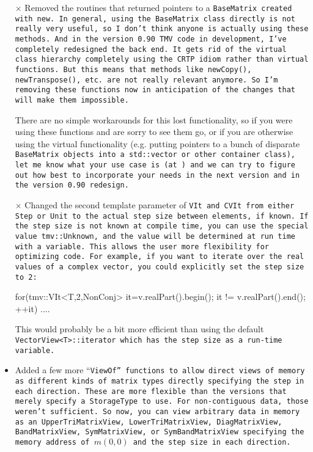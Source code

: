 \begin{itemize}
\item[$\times$] 
Removed the routines that returned pointers to a \tt{BaseMatrix} created with \tt{new}.  In general, using the \tt{BaseMatrix} class directly is not really very useful, so I don't think anyone is actually using these methods.  And in the version 0.90 TMV code in development, I've completely redesigned the back end.  It gets rid of the virtual class hierarchy completely using the CRTP idiom rather than virtual functions.  But this means that methods like \tt{newCopy()}, \tt{newTranspose()}, etc. are not really relevant anymore.  So I'm removing these functions now in anticipation of the changes that will make them impossible.

There are no simple workarounds for this lost functionality, so if you were using these functions and are sorry to see them go, or if you are otherwise using the virtual functionality (e.g. putting pointers to a bunch of disparate \tt{BaseMatrix} objects into a \tt{std::vector} or other container class), let me know what your use case is (at \mygroup) and we can try to figure out how best to incorporate your needs in the next version and in the version 0.90 redesign.

\item[$\times$]
Changed the second template parameter of \tt{VIt} and \tt{CVIt} from either \tt{Step} or \tt{Unit} to the actual step size between elements, if known.  If the step size is not known at compile time, you can use the special value \tt{tmv::Unknown}, and the value will be determined at run time with a variable.  This allows the user more flexibility for optimizing code.  For example, if you want to iterate over the real values of a complex vector, you could explicitly set the step size to 2:
\begin{tmvcode}
for(tmv::VIt<T,2,NonConj> it=v.realPart().begin(); 
    it != v.realPart().end(); ++it) {
  ....
}
\end{tmvcode}

This would probably be a bit more efficient than using the default \tt{VectorView<T>::iterator} which has the step size as a run-time variable.

\item 
Added a few more ``\tt{ViewOf}'' functions to allow direct views of memory as different kinds of matrix types directly specifying the step in each direction.  These are more flexible than the versions that merely specify a StorageType to use.  For non-contiguous data, those weren't sufficient.  So now, you can view arbitrary data in memory as an \tt{UpperTriMatrixView}, \tt{LowerTriMatrixView},
\tt{DiagMatrixView}, \tt{BandMatrixView}, \tt{SymMatrixView}, or \tt{SymBandMatrixView} specifying the memory address of $m(0,0)$ and the step size in each direction.


\end{itemize}
